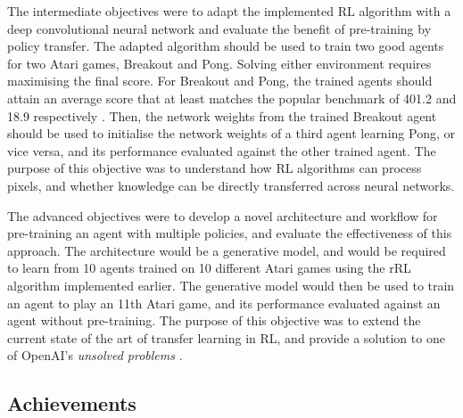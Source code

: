 \documentclass[12pt,a4paper]{article}
\begin{document}
The intermediate objectives were to adapt the implemented RL algorithm with a deep convolutional neural network and evaluate the benefit of pre-training by policy transfer. The adapted algorithm should be used to train two good agents for two Atari games, Breakout and Pong. Solving either environment requires maximising the final score. For Breakout and Pong, the trained agents should attain an average score that at least matches the popular benchmark of 401.2 and 18.9 respectively \cite{}. Then, the network weights from the trained Breakout agent should be used to initialise the network weights of a third agent learning Pong, or vice versa, and its performance evaluated against the other trained agent. The purpose of this objective was to understand how RL algorithms can process pixels, and whether knowledge can be directly transferred across neural networks.

The advanced objectives were to develop a novel architecture and workflow for pre-training an agent with multiple policies, and evaluate the effectiveness of this approach. The architecture would be a generative model, and would be required to learn from 10 agents trained on 10 different Atari games using the rRL algorithm implemented earlier. The generative model would then be used to train an agent to play an 11th Atari game, and its performance evaluated against an agent without pre-training. The purpose of this objective was to extend the current state of the art of transfer learning in RL, and provide a solution to one of OpenAI's \textit{unsolved problems} \cite{}.

\subsection{Achievements}
\end{document}
